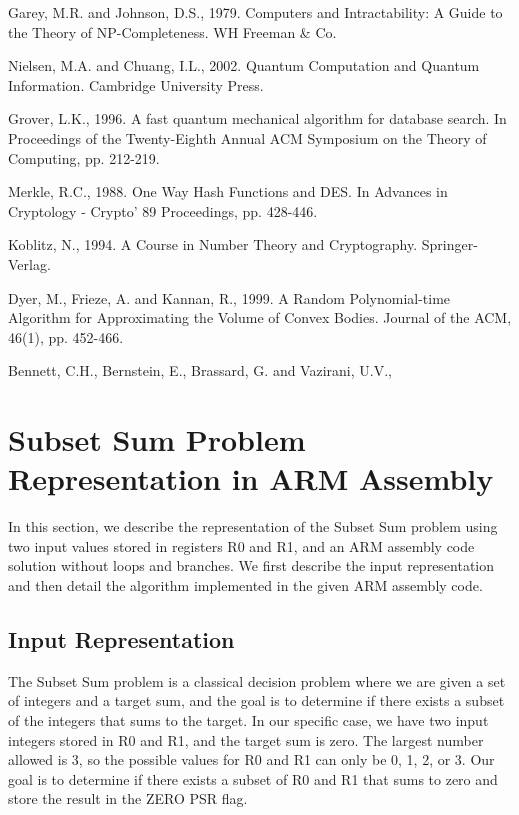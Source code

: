 \begin{thebibliography}{9}

Garey, M.R. and Johnson, D.S., 1979. Computers and Intractability: A Guide to the Theory of NP-Completeness. WH Freeman \& Co.

Nielsen, M.A. and Chuang, I.L., 2002. Quantum Computation and Quantum Information. Cambridge University Press.

Grover, L.K., 1996. A fast quantum mechanical algorithm for database search. In Proceedings of the Twenty-Eighth Annual ACM Symposium on the Theory of Computing, pp. 212-219.

Merkle, R.C., 1988. One Way Hash Functions and DES. In Advances in Cryptology - Crypto' 89 Proceedings, pp. 428-446.

Koblitz, N., 1994. A Course in Number Theory and Cryptography. Springer-Verlag.

Dyer, M., Frieze, A. and Kannan, R., 1999. A Random Polynomial-time Algorithm for Approximating the Volume of Convex Bodies. Journal of the ACM, 46(1), pp. 452-466.

Bennett, C.H., Bernstein, E., Brassard, G. and Vazirani, U.V.,

\section{Subset Sum Problem Representation in ARM Assembly}

In this section, we describe the representation of the Subset Sum problem using two input values stored in registers R0 and R1, and an ARM assembly code solution without loops and branches. We first describe the input representation and then detail the algorithm implemented in the given ARM assembly code.

\subsection{Input Representation}

The Subset Sum problem is a classical decision problem where we are given a set of integers and a target sum, and the goal is to determine if there exists a subset of the integers that sums to the target. In our specific case, we have two input integers stored in R0 and R1, and the target sum is zero. The largest number allowed is 3, so the possible values for R0 and R1 can only be 0, 1, 2, or 3. Our goal is to determine if there exists a subset of R0 and R1 that sums to zero and store the result in the ZERO PSR flag.


\end{thebibliography}
